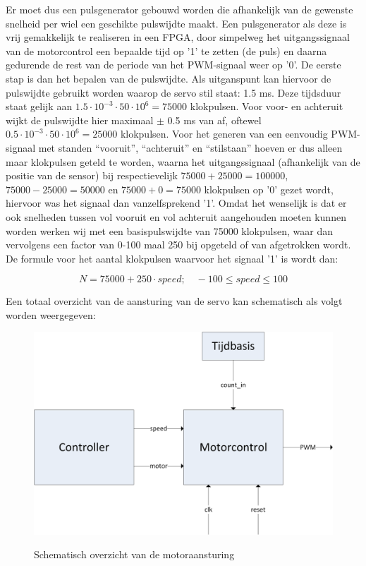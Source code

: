 \documentclass{report}
\begin{document}
Er moet dus een pulsgenerator gebouwd worden die afhankelijk van de gewenste snelheid per wiel een geschikte pulswijdte maakt. Een pulsgenerator als deze is vrij gemakkelijk te realiseren in een FPGA, door simpelweg het uitgangssignaal van de motorcontrol een bepaalde tijd op '1' te zetten (de puls) en daarna gedurende de rest van de periode van het PWM-signaal weer op '0'. De eerste stap is dan het bepalen van de pulswijdte. Als uitganspunt kan hiervoor de pulswijdte gebruikt worden waarop de servo stil staat: 1.5 ms. Deze tijdsduur staat gelijk aan $1.5 \cdot 10^{-3} \cdot 50 \cdot 10^{6} = 75000$ klokpulsen. Voor voor- en achteruit wijkt de pulswijdte hier maximaal $\pm$ 0.5 ms van af, oftewel $0.5 \cdot 10^{-3} \cdot 50 \cdot 10^{6} = 25000$ klokpulsen. Voor het generen van een eenvoudig PWM-signaal met standen ``vooruit'', ``achteruit'' en ``stilstaan'' hoeven er dus alleen maar klokpulsen geteld te worden, waarna het uitgangssignaal (afhankelijk van de positie van de sensor) bij respectievelijk $75000 + 25000 = 100000$, $75000 - 25000 = 50000$ en $75000 + 0 = 75000$ klokpulsen op '0' gezet wordt, hiervoor was het signaal dan vanzelfsprekend '1'.
Omdat het wenselijk is dat er ook snelheden tussen vol vooruit en vol achteruit aangehouden moeten kunnen worden werken wij met een basispulswijdte van 75000 klokpulsen, waar dan vervolgens een factor van 0-100 maal 250 bij opgeteld of van afgetrokken wordt. De formule voor het aantal klokpulsen waarvoor het signaal '1' is wordt dan:

\begin{equation}
	\label{eq:pulsewidth}
	N = 75000 + 250 \cdot speed;\quad -100 \leq speed \leq 100
\end{equation}

Een totaal overzicht van de aansturing van de servo kan schematisch als volgt worden weergegeven:

\begin{figure}[H]
	\includegraphics[width=\textwidth]{resource/motor-control}
	\label{fig:motorcontrol}
	\caption{Schematisch overzicht van de motoraansturing}
\end{figure}
\end{document}
